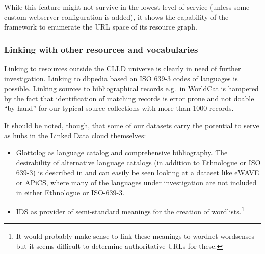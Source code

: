 \documentclass[a4paper,10pt]{article}
\begin{document}
%

While this feature might not survive in the lowest level of service (unless some custom
webserver configuration is added), it shows the capability of the framework to enumerate
the URL space of its resource graph.


\subsubsection{Linking with other resources and vocabularies}

Linking to resources outside the CLLD universe is clearly in need of further investigation.
Linking to dbpedia based on ISO 639-3 codes of languages is possible.
Linking sources to bibliographical records e.g.~in WorldCat is hampered by the fact that
identification of matching records is error prone and not doable ``by hand'' for our typical
source collections with more than 1000 records.

It should be noted, though, that some of our datasets carry the potential to serve as hubs
in the Linked Data cloud themselves:
\begin{itemize}
\item Glottolog as language catalog and comprehensive bibliography. The desirability of
alternative language catalogs (in addition to Ethnologue or ISO 639-3) is described in
 and can easily be seen looking at a dataset like eWAVE or APiCS, where
many of the languages under investigation are not included in either Ethnologue or ISO-639-3.
\item IDS as provider of semi-standard meanings for the creation of wordlists.\footnote{It
would probably make sense to link these meanings to wordnet wordsenses but it seems difficult
to determine authoritative URLs for these.}
\end{itemize}
\end{document}
